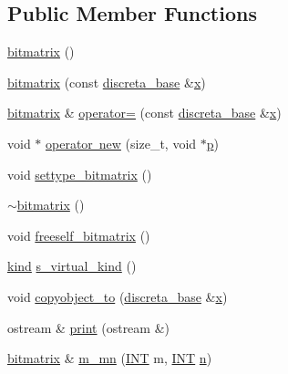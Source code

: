 \subsection*{Public Member Functions}
\begin{DoxyCompactItemize}
\item 
\mbox{\hyperlink{classbitmatrix_af6715cab25d568c8ad82c0dee2e9791d}{bitmatrix}} ()
\item 
\mbox{\hyperlink{classbitmatrix_a6a2ab85aca9b9c4a40336aceee91b24a}{bitmatrix}} (const \mbox{\hyperlink{classdiscreta__base}{discreta\+\_\+base}} \&\mbox{\hyperlink{alphabet2_8_c_a6150e0515f7202e2fb518f7206ed97dc}{x}})
\item 
\mbox{\hyperlink{classbitmatrix}{bitmatrix}} \& \mbox{\hyperlink{classbitmatrix_ac7386ca418929a7d0a0fdf38b0cb99e4}{operator=}} (const \mbox{\hyperlink{classdiscreta__base}{discreta\+\_\+base}} \&\mbox{\hyperlink{alphabet2_8_c_a6150e0515f7202e2fb518f7206ed97dc}{x}})
\item 
void $\ast$ \mbox{\hyperlink{classbitmatrix_a91f184b6e870e211db7535e9baaf710e}{operator new}} (size\+\_\+t, void $\ast$\mbox{\hyperlink{alphabet2_8_c_a533391314665d6bf1b5575e9a9cd8552}{p}})
\item 
void \mbox{\hyperlink{classbitmatrix_acb571d947f9526665ebbdc0ce3e2a973}{settype\+\_\+bitmatrix}} ()
\item 
\mbox{\hyperlink{classbitmatrix_a0ecd1bb827e476fb99640190cfa973f6}{$\sim$bitmatrix}} ()
\item 
void \mbox{\hyperlink{classbitmatrix_a4b84eed56a244df63819eae6b7ba1eff}{freeself\+\_\+bitmatrix}} ()
\item 
\mbox{\hyperlink{discreta_8h_aaf25ee7e2306d78c74ec7bc48f092e81}{kind}} \mbox{\hyperlink{classbitmatrix_a3e8982cdd7e500a0298a60469b4a5860}{s\+\_\+virtual\+\_\+kind}} ()
\item 
void \mbox{\hyperlink{classbitmatrix_ac97adfe8348d9fe6ef19447b7611bbea}{copyobject\+\_\+to}} (\mbox{\hyperlink{classdiscreta__base}{discreta\+\_\+base}} \&\mbox{\hyperlink{alphabet2_8_c_a6150e0515f7202e2fb518f7206ed97dc}{x}})
\item 
ostream \& \mbox{\hyperlink{classbitmatrix_a2e3eaa8cff111df76f48458406d93d72}{print}} (ostream \&)
\item 
\mbox{\hyperlink{classbitmatrix}{bitmatrix}} \& \mbox{\hyperlink{classbitmatrix_a3511956281a3f36f0013d90a7accc1bc}{m\+\_\+mn}} (\mbox{\hyperlink{galois_8h_a09fddde158a3a20bd2dcadb609de11dc}{I\+NT}} m, \mbox{\hyperlink{galois_8h_a09fddde158a3a20bd2dcadb609de11dc}{I\+NT}} \mbox{\hyperlink{simeon_8_c_a7f2cd26777ce0ff3fdaf8d02aacbddfb}{n}})

\end{DoxyCompactItemize}
